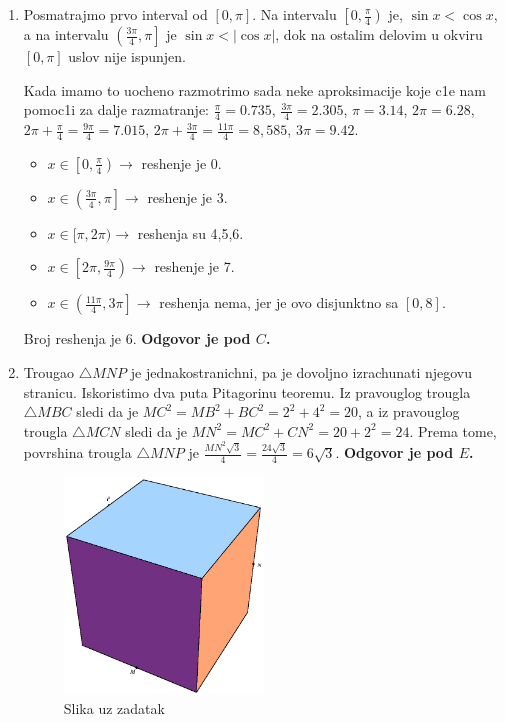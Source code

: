 \documentclass[a4paper,12pt]{article}
\begin{document}
\begin{enumerate}[1.]
\item Posmatrajmo prvo interval od $[0,\pi]$. Na intervalu $\left[0, \frac{\pi}{4}\right)$ je, $\sin x < \cos x$, a na intervalu $\left(\frac{3\pi}{4}, \pi\right]$ je $\sin x < |\cos x|$, dok na ostalim delovim u okviru $[0,\pi]$ uslov nije ispunjen.
\par Kada imamo to uocheno razmotrimo sada neke aproksimacije koje c1e nam pomoc1i za dalje razmatranje: $\frac{\pi}{4} = 0.735
$, $\frac{3\pi}{4} = 2.305$, $\pi = 3.14$, $2\pi = 6.28$, $2\pi + \frac{\pi}{4} =\frac{9\pi}{4} = 7.015$, $2\pi + \frac{3\pi}{4} =\frac{11\pi}{4} = 8,585$, $3\pi = 9.42$.
\begin{itemize}
\item $x \in \left[0,\frac{\pi}{4}\right)\rightarrow $ reshenje je 0.
\item $x \in \left(\frac{3\pi}{4}, \pi\right] \rightarrow $ reshenje je 3.
\item $x \in [\pi, 2\pi) \rightarrow $ reshenja su 4,5,6.
\item $x \in \left[2\pi, \frac{9\pi}{4}\right) \rightarrow $ reshenje je 7.
\item $x \in \left(\frac{11\pi}{4}, 3\pi\right] \rightarrow $ reshenja nema, jer je ovo disjunktno sa $[0,8]$.
\end{itemize}
\par Broj reshenja je 6. \textbf{Odgovor je pod $C$.} 


\item Trougao $\triangle MNP$ je jednakostranichni, pa je dovoljno izrachunati njegovu stranicu. Iskoristimo dva puta Pitagorinu teoremu. Iz pravouglog trougla $\triangle MBC$ sledi da je $MC^2=MB^2+BC^2=2^2+4^2=20$, a iz pravouglog trougla $\triangle MCN$ sledi da je $MN^2=MC^2+CN^2=20+2^2=24$. Prema tome, povrshina trougla $\triangle MNP$ je $\frac{MN^2\sqrt{3}}{4}=\frac{24\sqrt{3}}{4}=6\sqrt{3}$. \textbf{Odgovor je pod $E$.}


\begin{figure}[h!]
\begin{center}
\includegraphics[width=0.5\textwidth]{sl5.eps}
\caption{Slika uz zadatak}
\end{center}
\end{figure}


\end{enumerate}
\end{document}
